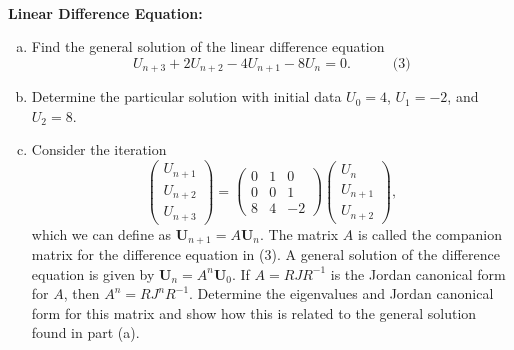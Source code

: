 \documentclass{article}
\begin{document}
\begin{problem} \\ 
    \textbf{Linear Difference Equation:} \\
    \begin{enumerate}[(a)]
        \item Find the general solution of the linear difference equation 
        \[U_{n+3} + 2U_{n+2} - 4U_{n+1} - 8U_n =0. \quad \quad \quad \text{(3)} \]
        \item Determine the particular solution with initial data $U_0=4$, $U_1=-2$, and $U_2=8$.
        \item Consider the iteration \[
            \left(\begin{array}{c} U_{n+1} \\ U_{n+2} \\ U_{n+3} \end{array} \right)
            =
            \left( \begin{array}{ccc} 0 & 1 & 0 \\ 0 & 0 & 1 \\ 8 & 4 & -2 \end{array} \right)
            \left(\begin{array}{c} U_{n} \\ U_{n+1} \\ U_{n+2} \end{array} \right),
            \] 
            which we can define as $\mathbf{U}_{n+1} = A \mathbf{U}_n$. The matrix $A$ is called the companion matrix for the difference equation in (3). A general solution of the difference equation is given by $\mathbf{U}_{n} = A^n \mathbf{U}_0$. If $A=RJR^{-1}$ is the Jordan canonical form for $A$, then $A^n = RJ^n R^{-1}$. Determine the eigenvalues and Jordan canonical form for this matrix and show how this is related to the general solution found in part (a).
    \end{enumerate}
\end{problem}
\end{document}
